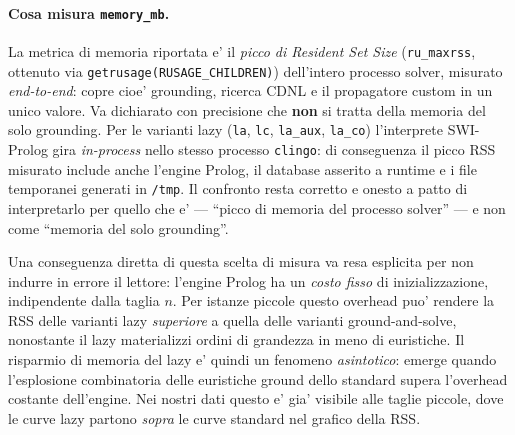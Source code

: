 

\paragraph{Cosa misura \texttt{memory\_mb}.}
La metrica di memoria riportata e' il \emph{picco di Resident Set Size}
(\texttt{ru\_maxrss}, ottenuto via \texttt{getrusage(RUSAGE\_CHILDREN)}) dell'intero
processo solver, misurato \emph{end-to-end}: copre cioe' grounding, ricerca CDNL
e il propagatore custom in un unico valore. Va dichiarato con precisione che
\textbf{non} si tratta della memoria del solo grounding. Per le varianti lazy
(\texttt{la}, \texttt{lc}, \texttt{la\_aux}, \texttt{la\_co}) l'interprete
SWI-Prolog gira \emph{in-process} nello stesso processo \texttt{clingo}: di
conseguenza il picco RSS misurato include anche l'engine Prolog, il database
asserito a runtime e i file temporanei generati in \texttt{/tmp}. Il confronto
resta corretto e onesto a patto di interpretarlo per quello che e' --- ``picco
di memoria del processo solver'' --- e non come ``memoria del solo grounding''.

Una conseguenza diretta di questa scelta di misura va resa esplicita per non
indurre in errore il lettore: l'engine Prolog ha un \emph{costo fisso} di
inizializzazione, indipendente dalla taglia $n$. Per istanze piccole questo
overhead puo' rendere la RSS delle varianti lazy \emph{superiore} a quella delle
varianti ground-and-solve, nonostante il lazy materializzi ordini di grandezza
in meno di euristiche. Il risparmio di memoria del lazy e' quindi un fenomeno
\emph{asintotico}: emerge quando l'esplosione combinatoria delle euristiche
ground dello standard supera l'overhead costante dell'engine. Nei nostri dati
questo e' gia' visibile alle taglie piccole, dove le curve lazy partono
\emph{sopra} le curve standard nel grafico della RSS.


